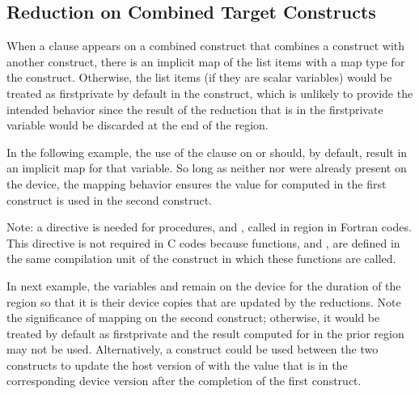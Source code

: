 \subsection{Reduction on Combined Target Constructs}
\label{subsec:target_reduction}

When a  clause appears on a combined construct that combines 
a  construct with another construct, there is an implicit map 
of the list items with a  map type for the  construct. 
Otherwise, the list items (if they are scalar variables) would be 
treated as firstprivate by default in the  construct, which 
is unlikely to provide the intended behavior since the result of the
reduction that is in the firstprivate variable would be discarded 
at the end of the  region.

In the following example, the use of the  clause on 
or  should, by default, result in an implicit  map for
that variable. So long as neither  nor  were already
present on the device, the mapping behavior ensures the value for
 computed in the first  construct is used in the
second  construct.

Note: a  directive is needed for procedures,
 and , called in  region in Fortran codes. 
This directive is not required in C codes because functions, 
and , are defined in the same compilation unit of the 
construct in which these functions are called.



In next example,  the variables  and  remain on the
device for the duration of the  region so that it is
their device copies that are updated by the reductions. Note the significance
of mapping  on the second  construct; otherwise, it
would be treated by default as firstprivate and the result computed for
 in the prior  region may not be used. Alternatively, a
 construct could be used between the two
 constructs to update the host version of  with the
value that is in the corresponding device version after the completion of the
first construct.

